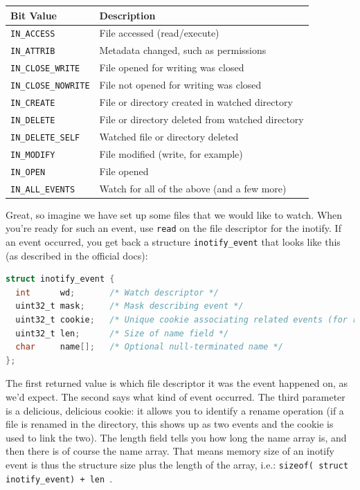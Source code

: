 \documentclass[a4paper]{report}
\begin{document}
\begin{center}
	\begin{tabular}{l|l}
		\textbf{Bit Value}          & \textbf{Description}                             \\ \hline
		\texttt{IN\_ACCESS}         & File accessed (read/execute)                     \\
		\texttt{IN\_ATTRIB}         & Metadata changed, such as permissions            \\
		\texttt{IN\_CLOSE\_WRITE}   & File opened for writing was closed               \\
		\texttt{IN\_CLOSE\_NOWRITE} & File not opened for writing was closed           \\
		\texttt{IN\_CREATE}         & File or directory created in watched directory   \\
		\texttt{IN\_DELETE}         & File or directory deleted from watched directory \\
		\texttt{IN\_DELETE\_SELF}   & Watched file or directory deleted                \\
		\texttt{IN\_MODIFY}         & File modified (write, for example)               \\
		\texttt{IN\_OPEN}           & File opened                                      \\
		\texttt{IN\_ALL\_EVENTS}    & Watch for all of the above (and a few more)
	\end{tabular}
\end{center}

Great, so imagine we have set up some files that we would like to watch. When you're ready for such an event, use \texttt{read} on the file descriptor for the inotify. If an event occurred, you get back a structure \texttt{inotify\_event} that looks like this (as described in the official docs):

\begin{lstlisting}[language=C]
struct inotify_event {
  int      wd;       /* Watch descriptor */
  uint32_t mask;     /* Mask describing event */
  uint32_t cookie;   /* Unique cookie associating related events (for rename(2)) */  
  uint32_t len;      /* Size of name field */
  char     name[];   /* Optional null-terminated name */
};
\end{lstlisting}

The first returned value is which file descriptor it was the event happened on, as we'd expect. The second says what kind of event occurred. The third parameter is a delicious, delicious cookie: it allows you to identify a rename operation (if a file is renamed in the directory, this shows up as two events and the cookie is used to link the two). The length field tells you how long the name array is, and then there is of course the name array. That means memory size of an inotify event is thus the structure size plus the length of the array, i.e.: \texttt{sizeof( struct inotify\_event) + len}~\cite{lpi}.
\end{document}
